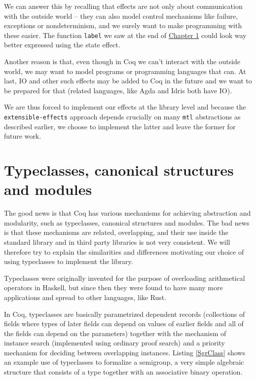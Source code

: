 \documentclass[declaration,inz,english,shortabstract]{iithesis}
\newcommand{\m}[1]{\texttt{#1}}
\begin{document}
We can answer this by recalling that effects are not only about communication with the outside world -- they can also model control mechanisms like failure, exceptions or nondeterminism, and we surely want to make programming with these easier. The function \m{label} we saw at the end of \hyperref[ch1]{Chapter 1} could look way better expressed using the state effect.

Another reason is that, even though in Coq we can't interact with the outside world, we may want to model programs or programming languages that can. At last, IO and other such effects may be added to Coq in the future and we want to be prepared for that (related languages, like Agda \cite{Agda} and Idris \cite{Idris} both have IO).

We are thus forced to implement our effects at the library level and because the \m{extensible-effects} approach depends crucially on many \m{mtl} abstractions as described earlier, we choose to implement the latter and leave the former for future work.

\section{Typeclasses, canonical structures and modules}

The good news is that Coq has various mechanisms for achieving abstraction and modularity, such as typeclasses, canonical structures and modules. The bad news is that these mechanisms are related, overlapping, and their use inside the standard library and in third party libraries is not very consistent. We will therefore try to explain the similarities and differences motivating our choice of using typeclasses to implement the library.

Typeclasses \cite{Classes1} \cite{Classes2} were originally invented for the purpose of overloading arithmetical operators in Haskell, but since then they were found to have many more applications and spread to other languages, like Rust.

In Coq, typeclasses are basically parametrized dependent records (collections of fields where types of later fields can depend on values of earlier fields and all of the fields can depend on the parameters) together with the mechanism of instance search (implemented using ordinary proof search) and a priority mechanism for deciding between overlapping instances. Listing \ref{SgrClass} shows an example use of typeclasses to formalize a semigroup, a very simple algebraic structure that consists of a type together with an associative binary operation.
\end{document}
